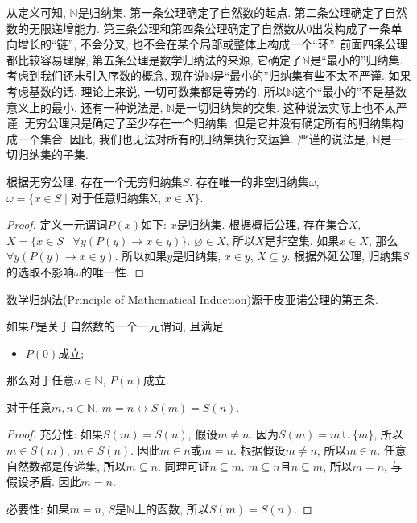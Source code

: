 从定义可知, $\mathbb N$是归纳集. 第一条公理确定了自然数的起点. 第二条公理确定了自然数的无限递增能力. 第三条公理和第四条公理确定了自然数从$0$出发构成了一条单向增长的``链'', 不会分叉, 也不会在某个局部或整体上构成一个``环''. 前面四条公理都比较容易理解, 第五条公理是数学归纳法的来源, 它确定了$\mathbb N$是``最小的''归纳集. 考虑到我们还未引入序数的概念, 现在说$\mathbb N$是``最小的''归纳集有些不太不严谨. 如果考虑基数的话, 理论上来说, 一切可数集都是等势的. 所以$\mathbb N$这个``最小的''不是基数意义上的最小. 还有一种说法是, $\mathbb N$是一切归纳集的交集. 这种说法实际上也不太严谨. 无穷公理只是确定了至少存在一个归纳集, 但是它并没有确定所有的归纳集构成一个集合. 因此, 我们也无法对所有的归纳集执行交运算. 严谨的说法是, $\mathbb N$是一切归纳集的子集.

\begin{theorem}
	根据无穷公理, 存在一个无穷归纳集$S$. 存在唯一的非空归纳集$\omega$, $\omega=\{x\in S\mid \text{对于任意归纳集X, } x\in X\}$.
\end{theorem}

\begin{proof}
	定义一元谓词$P(x)$如下: $x$是归纳集. 根据概括公理, 存在集合$X$, $X=\{x\in S\mid \forall y(P(y)\rightarrow x\in y)\}$. $\varnothing \in X$, 所以$X$是非空集. 如果$x\in X$, 那么$\forall y(P(y)\rightarrow x\in y)$. 所以如果$y$是归纳集, $x\in y$, $X\subseteq y$. 根据外延公理, 归纳集$S$的选取不影响$\omega$的唯一性.
\end{proof}


数学归纳法(Principle of Mathematical Induction)源于皮亚诺公理的第五条.

\begin{axiom}[数学归纳法]
	如果$P$是关于自然数的一个一元谓词, 且满足:
	\begin{itemize}
		\item $P(0)$成立;
	\end{itemize}
	那么对于任意$n\in \mathbb N$, $P(n)$成立.
\end{axiom}

\begin{proposition}
	对于任意$m,n\in \mathbb N$, $m=n\leftrightarrow S(m)=S(n)$.
\end{proposition}

\begin{proof}
	充分性: 如果$S(m)=S(n)$, 假设$m\neq n$. 因为$S(m)=m\cup \{m\}$, 所以$m\in S(m)$, $m\in S(n)$. 因此$m\in n$或$m=n$. 根据假设$m\neq n$, 所以$m\in n$. 任意自然数都是传递集, 所以$m\subseteq n$. 同理可证$n\subseteq m$. $m\subseteq n$且$n\subseteq m$, 所以$m=n$, 与假设矛盾. 因此$m=n$.

	必要性: 如果$m=n$, $S$是$\mathbb N$上的函数, 所以$S(m)=S(n)$.
\end{proof}

